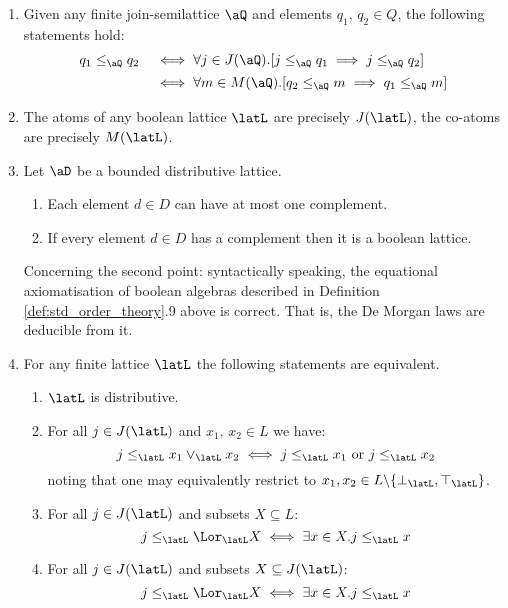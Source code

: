 \documentclass{article}
\begin{document}
\begin{lemma}
\begin{enumerate}
\item
Given any finite join-semilattice $\aQ$ and elements $q_1,\, q_2 \in Q$, the following statements hold:
\[
\begin{tabular}{ll}
$q_1 \leq_\aQ q_2$ & $\iff \forall j \in J(\aQ).[ j \leq_\aQ q_1 \implies j \leq_\aQ q_2  ]$
\\[1ex]
& $\iff \forall m \in M(\aQ).[ q_2 \leq_\aQ m \implies q_1 \leq_\aQ m  ]$
\end{tabular}
\]


\item
The atoms of any boolean lattice $\latL$ are precisely $J(\latL)$, the co-atoms are precisely $M(\latL)$.

\item
Let $\aD$ be a bounded distributive lattice.
\begin{enumerate}
\item
Each element $d \in D$ can have at most one complement. 
\item
If every element $d \in D$ has a complement then it is a boolean lattice.
\end{enumerate}
Concerning the second point: syntactically speaking, the equational axiomatisation of boolean algebras described in Definition \ref{def:std_order_theory}.9 above is correct. That is, the De Morgan laws are deducible from it.

\item
For any finite lattice $\latL$ the following statements are equivalent.
\begin{enumerate}
\item
$\latL$ is distributive.
\item
For all $j \in J(\latL)$ and $x_1,\, x_2 \in L$ we have:
 \[
j \leq_\latL x_1 \lor_\latL x_2 
\iff
j \leq_\latL x_1 \text{ or } j \leq_\latL x_2
\]
noting that one may equivalently restrict to $x_1, x_2 \in L \backslash \{\bot_\latL,\top_\latL\}$.
\item
For all $j \in J(\latL)$ and subsets $X \subseteq L$:
\[
j \leq_\latL \Lor_\latL X
\iff
\exists x \in X. j \leq_\latL x
\]
\item
For all $j \in J(\latL)$ and subsets $X \subseteq J(\latL)$:
\[
j \leq_\latL \Lor_\latL X
\iff
\exists x \in X. j \leq_\latL x
\]
\end{enumerate}



\end{enumerate}
\end{lemma}
\end{document}
